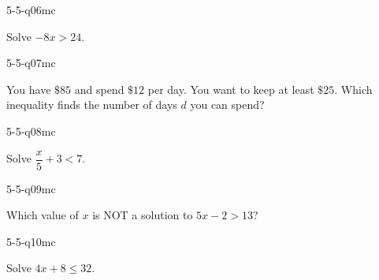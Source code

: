 \begin{practiceQuestion}{5-5-q06}{mc}
\begin{questionText}
Solve $-8x > 24$.
\end{questionText}
\end{practiceQuestion}

\begin{practiceQuestion}{5-5-q07}{mc}
\begin{questionText}
You have $\$85$ and spend $\$12$ per day. You want to keep at least $\$25$. Which inequality finds the number of days $d$ you can spend?
\end{questionText}
\end{practiceQuestion}

\begin{practiceQuestion}{5-5-q08}{mc}
\begin{questionText}
Solve $\dfrac{x}{5} + 3 < 7$.
\end{questionText}
\end{practiceQuestion}

\begin{practiceQuestion}{5-5-q09}{mc}
\begin{questionText}
Which value of $x$ is NOT a solution to $5x - 2 > 13$?
\end{questionText}
\end{practiceQuestion}

\begin{practiceQuestion}{5-5-q10}{mc}
\begin{questionText}
Solve $4x + 8 \leq 32$.
\end{questionText}
\end{practiceQuestion}

